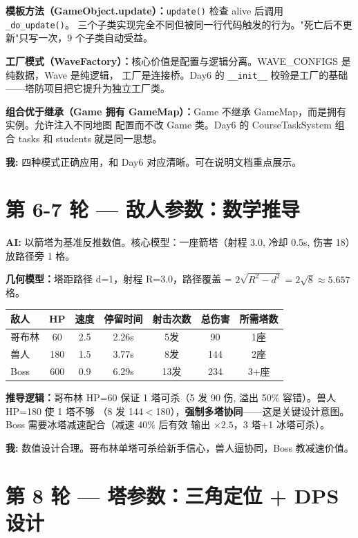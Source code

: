 \documentclass[12pt,a4paper]{ctexart}
\begin{document}
\textbf{模板方法（GameObject.update）：}\texttt{update()} 检查 alive 后调用 \texttt{\_do\_update()}。
三个子类实现完全不同但被同一行代码触发的行为。"死亡后不更新"只写一次，9 个子类自动受益。

\textbf{工厂模式（WaveFactory）：}核心价值是配置与逻辑分离。WAVE\_CONFIGS 是纯数据，Wave 是纯逻辑，
工厂是连接桥。Day6 的 \texttt{\_\_init\_\_} 校验是工厂的基础——塔防项目把它提升为独立工厂类。

\textbf{组合优于继承（Game 拥有 GameMap）：}Game 不继承 GameMap，而是拥有实例。允许注入不同地图
配置而不改 Game 类。Day6 的 CourseTaskSystem 组合 tasks 和 students 就是同一思想。

\textbf{我:} 四种模式正确应用，和 Day6 对应清晰。可在说明文档重点展示。

\section*{第 6-7 轮 — 敌人参数：数学推导}

\textbf{AI:} 以箭塔为基准反推数值。核心模型：一座箭塔（射程 3.0, 冷却 0.5s, 伤害 18）放路径旁 1 格。

\textbf{几何模型：}塔距路径 d=1，射程 R=3.0，路径覆盖 = $2\sqrt{R^2-d^2}=2\sqrt{8}\approx5.657$ 格。

\begin{center}
\begin{tabular}{lcccccc}
\toprule
敌人 & HP & 速度 & 停留时间 & 射击次数 & 总伤害 & 所需塔数 \\
\midrule
哥布林 & 60 & 2.5 & 2.26s & 5发 & 90 & 1座 \\
兽人 & 180 & 1.5 & 3.77s & 8发 & 144 & 2座 \\
Boss & 600 & 0.9 & 6.29s & 13发 & 234 & 3+座 \\
\bottomrule
\end{tabular}
\end{center}

\textbf{推导逻辑：}哥布林 HP=60 保证 1 塔可杀（5 发 90 伤, 溢出 50\% 容错）。兽人 HP=180 使 1 塔不够
（8 发 144$<$180），\textbf{强制多塔协同}——这是关键设计意图。Boss 需要冰塔减速配合（减速 40\% 后有效
输出 $\times 2.5$，3 塔+1 冰塔可杀）。

\textbf{我:} 数值设计合理。哥布林单塔可杀给新手信心，兽人逼协同，Boss 教减速价值。

\section*{第 8 轮 — 塔参数：三角定位 + DPS 设计}
\end{document}
